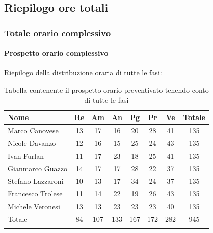 \subsection{Riepilogo ore totali}
\subsubsection{Totale orario complessivo}
\paragraph{Prospetto orario complessivo}
Riepilogo della distribuzione oraria di tutte le fasi:

\begin{longtable}{|l|c|c|c|c|c|c|c|}
	\hline
	\rowcolor{lighter-grayer}
	\textbf{Nome}     & \textbf{Re} & \textbf{Am} & \textbf{An} & \textbf{Pg} & \textbf{Pr} & \textbf{Ve} & \textbf{Totale} \\
	\hline
	\endfirsthead

	\hline
	Marco Canovese    & 13          & 17          & 16          & 20          & 28          & 41          & 135             \\
	\hline
	\hline
	Nicole Davanzo    & 12          & 16          & 15          & 25          & 24          & 43          & 135             \\
	\hline
	\hline
	Ivan Furlan       & 11          & 17          & 23          & 18          & 25          & 41          & 135             \\
	\hline
	\hline
	Gianmarco Guazzo  & 14          & 17          & 17          & 28          & 22          & 37          & 135             \\
	\hline
	\hline
	Stefano Lazzaroni & 10          & 13          & 17          & 34          & 24          & 37          & 135             \\
	\hline
	\hline
	Francesco Trolese & 11          & 14          & 22          & 19          & 26          & 43          & 135             \\
	\hline
	\hline
	Michele Veronesi  & 13          & 13          & 23          & 23          & 23          & 40          & 135             \\
	\hline
	\hline
	Totale            & 84          & 107         & 133         & 167         & 172         & 282         & 945             \\
	\hline
	\rowcolor{white}
	\caption{Tabella contenente il prospetto orario preventivato tenendo conto di tutte le fasi}
\end{longtable}


